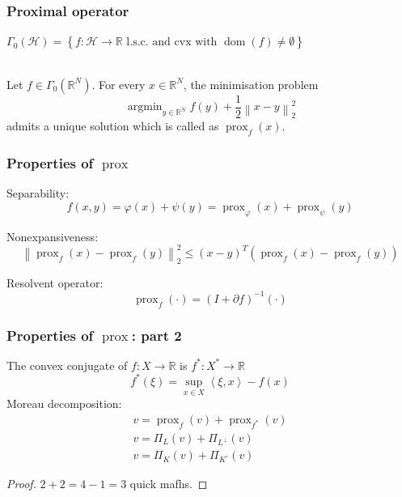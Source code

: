 \documentclass[aspectratio=169]{beamer}
\DeclareMathOperator{\Prox}{prox}
\newcommand{\prox}[2]{\Prox_{#1}\left({#2}\right)}
\newcommand{\RR}{\mathbb{R}}
\newcommand{\normtwosq}[1]{\left\|#1\right\|_2^2}
\renewcommand{\phi}{\varphi}
\DeclareMathOperator*{\argmin}{argmin}
\DeclareMathOperator{\dom}{dom}
\begin{document}
		\begin{frame}
		\frametitle{Proximal operator}
		$\Gamma_0(\mathcal{H}) = \left\{f:\mathcal{H}\to\RR\text{ l.s.c. and cvx with } \dom(f)\ne\emptyset\right\}$
		\quad \\ \quad \\
		\begin{definition}
		\label{def:proximaloperator}
		Let $f\in\Gamma_0(\RR^N)$. For every $x \in \RR^N$, the minimisation problem
		\begin{equation}
		\nonumber
		\argmin_{y\in\RR^N} f(y) + \frac{1}{2}\normtwosq{x-y}
		\end{equation}
		admits a unique solution which is called as $\prox{f}{x}$.
		\end{definition}
		\end{frame}

		\begin{frame}
		\frametitle{Properties of $\Prox$}
		{Separability}:
		\begin{equation}
		\nonumber f(x,y) = \phi(x)+\psi(y) = \prox{\phi}{x} + \prox{\psi}{y}
		\end{equation}
		
		{Nonexpansiveness}:
		\begin{equation}
		\nonumber \normtwosq{\prox{f}{x}-\prox{f}{y}} \le \left(x-y\right)^T\left(\prox{f}{x} - \prox{f}{y}\right)
		\end{equation}
		
		{Resolvent operator}: 
		\begin{equation}
		\nonumber \prox{f}{\cdot} = \left(I + \partial f\right)^{-1} (\cdot)
		\end{equation}
		\end{frame}
		
		\begin{frame}
		\frametitle{Properties of $\Prox$: part 2}
		The convex conjugate of $f:X\to\RR$ is $f^*:X^*\to\RR$
		\begin{equation}
		\nonumber
		f^*(\xi) = \sup_{x\in X}\left<\xi,x\right>-f(x)
		\end{equation}
		\pause
		{Moreau decomposition}:
		\begin{gather}
		\nonumber v = \prox{f}{v} + \prox{f^*}{v}\\
		\nonumber v = \Pi_L(v) + \Pi_{L^\perp}(v)\\
		\nonumber v = \Pi_K(v) + \Pi_{K^\circ}(v)
		\end{gather}
		\begin{proof}
		$2+2=4-1=3$ quick mafhs.
		\end{proof}
		\end{frame}
		
\end{document}
